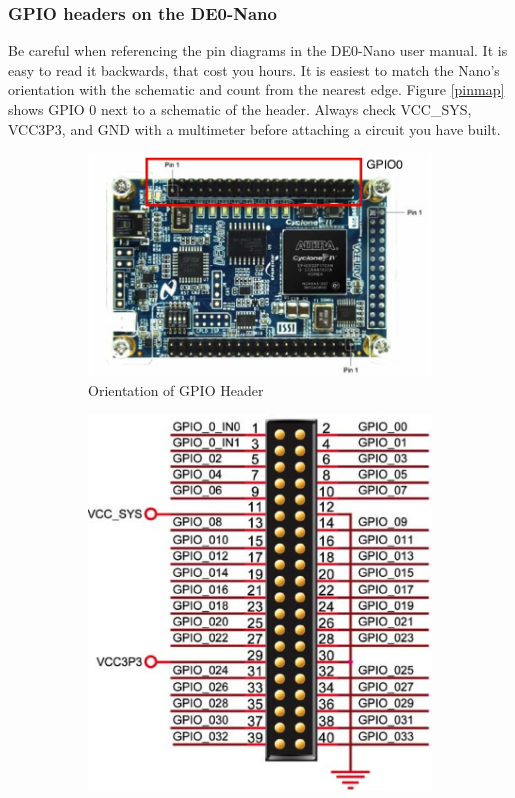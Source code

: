       \subsubsection{GPIO headers on the DE0-Nano} 
        Be careful when referencing the pin diagrams in the DE0-Nano user manual. It is easy to read it backwards, that cost you hours. It is easiest to match the Nano's orientation with the schematic and count from the nearest edge. Figure \ref{pinmap} shows GPIO 0 next to a schematic of the header. Always check VCC\_SYS, VCC3P3, and GND with a multimeter before attaching a circuit you have built.        
        \begin{figure}
          \centering
          \begin{subfigure}[b]{.38\textwidth}
            \includegraphics[angle=270, width=.9\textwidth]{Images/LabeledGPIOHeaders.jpg}
            \caption{Orientation of GPIO Header\cite{DE0Manual}}
          \end{subfigure}
          \begin{subfigure}[b]{.45\textwidth}
            \includegraphics[width=\textwidth]{Images/GPIOHeader.jpg}

\end{subfigure}
\end{figure}
